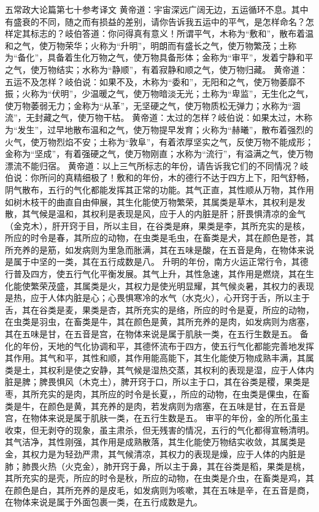 \documentclass[12pt,UTF8]{ctexbook}
\begin{document}
五常政大论篇第七十参考译文
黄帝道：宇宙深远广阔无边，五运循环不息。其中有盛衰的不同，随之而有损益的差别，请你告诉我五运中的平气，是怎样命名？怎样定其标志的？岐伯答道：你问得真有意义！所谓平气，木称为“敷和”，散布着温和之气，使万物荣华；火称为“升明”，明朗而有盛长之气，使万物繁茂；土称为“备化”，具备着生化万物之气，使万物具备形体；金称为“审平”，发着宁静和平之气，使万物结实；水称为“静顺”，有着寂静和顺之气，使万物归藏。
黄帝道：五运不及怎样？岐伯说：如果不及，木称为“委和”，无阳和之气，使万物萎靡不振；火称为“伏明”，少温暖之气，使万物暗淡无光；土称为“卑监”，无生化之气，使万物萎弱无力；金称为“从革”，无坚硬之气，使万物质松无弹力；水称为“涸流”，无封藏之气，使万物干枯。
黄帝道：太过的怎样？岐伯说：如果太过，木称为“发生”，过早地散布温和之气，使万物提早发育；火称为“赫曦”，散布着强烈的火气，使万物烈焰不安；土称为“敦阜”，有着浓厚坚实之气，反使万物不能成形；金称为“坚成”，有着强硬之气，使万物刚直；水称为“流行”，有溢满之气，使万物漂流不能归宿。
黄帝道：以上三气所标志的年份，请告诉我它们的不同情况？岐伯说：你所问的真精细极了！敷和的年份，木的德行不达于四方上下，阳气舒畅，阴气散布，五行的气化都能发挥其正常的功能。其气正直，其性顺从万物，其作用如树木枝干的曲直自由伸展，其生化能使万物繁荣，其属类是草木，其权利是发散，其气候是温和，其权利是表现是风，应于人的内脏是肝；肝畏惧清凉的金气（金克木），肝开窍于目，所以主目，在谷类是麻，果类是李，其所充实的是核，所应的时令是春，其所应的动物，在虫类是毛虫，在畜类是犬，其在颜色是苍，其所充养的是筋，如发病则为里急而胀满，其在五味是酸，在五音是角，在物体来说是属于中坚的一类，其在五行成数是八。
升明的年份，南方火运正常行令，其德行普及四方，使五行气化平衡发展。其气上升，其性急速，其作用是燃烧，其在生化能使繁荣茂盛，其属类是火，其权力是使光明显耀，其气候炎暑，其权力的表现是热，应于人体内脏是心；心畏惧寒冷的水气（水克火），心开窍于舌，所以主于舌，其在谷类是麦，果类是杏，其所充实的是络，所应的时令是夏，所应的动物，在虫类是羽虫，在畜类是牛，其在颜色是黄，其所充养的是肉，如发病则为痞塞，其在五味是甘，在五音是宫，在物体来说是属于肌肤一类，在五行生数是五。
备化的年份，天地的气化协调和平，其德怀流布于四方，使五行气化都能完善地发挥其作用。其气和平，其性和顺，其作用能高能下，其生化能使万物成熟丰满，其属类是土，其权利是使之安静，其气候是湿热交蒸，其权利的表现是湿，应于人体内脏是脾；脾畏惧风（木克土），脾开窍于口，所以主于口，其在谷类是稷，果类是枣，其所充实的是肉，其所应的时令是长夏，，所应的动物，在虫类是倮虫，在畜类是牛，在颜色是黄，其充养的是肉，若发病则为痞塞，在五味是甘，在五音是宫，在物体来说是属于肌肤一类，在五行生数是五。
审平的年份，金的所化虽主收束，但无剥夺的现象，虽主肃杀，但无残害的情况，五行的气化都得宣畅清明。其气洁净，其性刚强，其作用是成熟散落，其生化能使万物结实收敛，其属类是金，其权力是为轻劲严肃，其气候清凉，其权力的表现是燥，应于人体的内脏是肺；肺畏火热（火克金），肺开窍于鼻，所以主于鼻，其在谷类是稻，果类是桃，其所充实的是壳，所应的时令是秋，所应的动物，在虫类是介虫，在畜类是鸡，其在颜色是白，其所充养的是皮毛，如发病则为咳嗽，其在五味是辛，在五音是商，在物体来说是属于外面包裹一类，在五行成数是九。
\end{document}
